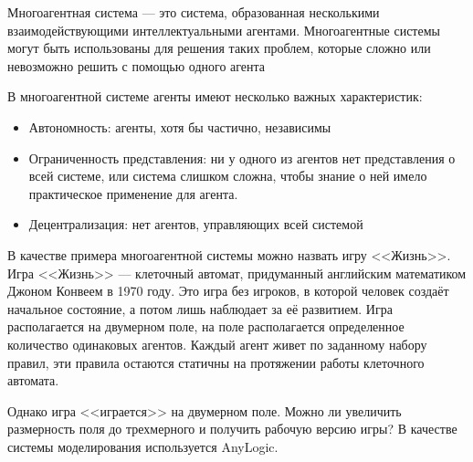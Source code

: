
Многоагентная система — это система, образованная несколькими взаимодействующими интеллектуальными агентами.
Многоагентные системы могут быть использованы для решения таких проблем, которые сложно или невозможно решить с помощью одного агента

В многоагентной системе агенты имеют несколько важных характеристик:

\begin{itemize}
    \item Автономность: агенты, хотя бы частично, независимы
    \item Ограниченность представления: ни у одного из агентов нет представления о всей системе, или система слишком сложна, чтобы знание о ней имело практическое применение для агента.
    \item Децентрализация: нет агентов, управляющих всей системой
\end{itemize}

В качестве примера многоагентной системы можно назвать игру <<Жизнь>>. 
Игра <<Жизнь>> — клеточный автомат, придуманный английским математиком Джоном Конвеем в 1970 году\cite{Gardner1970}.
Это игра без игроков, в которой человек создаёт начальное состояние, а потом лишь наблюдает за её развитием.
Игра располагается на двумерном поле, на поле располагается определенное количество одинаковых агентов.
Каждый агент живет по заданному набору правил, эти правила остаются статичны на протяжении работы клеточного автомата.

Однако игра <<играется>> на двумерном поле. Можно ли увеличить размерность поля до трехмерного и получить рабочую версию игры?
В качестве системы моделирования используется AnyLogic\cite{AnyLogic}. 


\clearpage